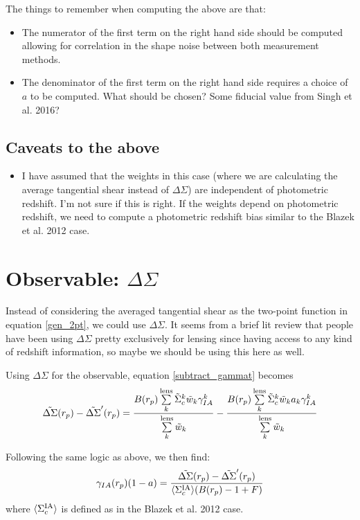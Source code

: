 \documentclass[onecolumn,amsmath,aps,fleqn, superscriptaddress]{revtex4}
\begin{document}
The things to remember when computing the above are that:
\begin{itemize}
\item{The numerator of the first term on the right hand side should be computed allowing for correlation in the shape noise between both measurement methods.}
\item{The denominator of the first term on the right hand side requires a choice of $a$ to be computed. What should be chosen? Some fiducial value from Singh et al. 2016?}
\end{itemize}

\subsection*{Caveats to the above}
\begin{itemize}
\item{I have assumed that the weights in this case (where we are calculating the average tangential shear instead of $\Delta \Sigma$) are independent of photometric redshift. I'm not sure if this is right. If the weights depend on photometric redshift, we need to compute a photometric redshift bias similar to the Blazek et al. 2012 case.}
\end{itemize}

\section*{Observable: $\Delta \Sigma$}

Instead of considering the averaged tangential shear as the two-point function in equation \ref{gen_2pt}, we could use $\Delta \Sigma$. It seems from a brief lit review that people have been using $\Delta \Sigma$ pretty exclusively for lensing since having access to any kind of redshift information, so maybe we should be using this here as well.

Using $\Delta \Sigma$ for the observable, equation \ref{subtract_gammat} becomes
\begin{equation}
\tilde{\Delta \Sigma}(r_p) - \tilde{\Delta \Sigma}'(r_p) = \frac{B(r_p) \sum\limits_{k}^{\rm lens} \tilde{\Sigma}_c^k\tilde{w}_k \gamma_{IA}^k}{\sum\limits_{k}^{\rm lens} \tilde{w}_k} - \frac{B(r_p) \sum\limits_{k}^{\rm lens} \tilde{\Sigma}_c^k \tilde{w}_k a_k\gamma_{IA}^k}{\sum\limits_{k}^{\rm lens} \tilde{w}_k}
\label{subtract_deltaS}
\end{equation}

Following the same logic as above, we then find:
\begin{equation}
\gamma_{IA}(r_p)(1-a) = \frac{\tilde{\Delta \Sigma}(r_p) - \tilde{\Delta \Sigma}'(r_p)}{\langle \Sigma_c^{\rm IA}\rangle (B(r_p)-1+F)}
\label{gammaIA_sol_DS}
\end{equation}
where $\langle \Sigma_c^{\rm IA}\rangle$ is defined as in the Blazek et al. 2012 case.
\end{document}

